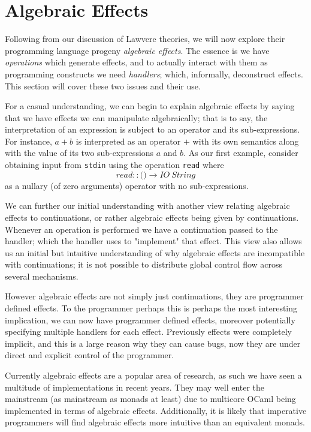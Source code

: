 \section{Algebraic Effects}
Following from our discussion of Lawvere theories,
we will now explore their programming language progeny \textit{algebraic effects}.
The essence is we have \textit{operations} which generate effects,
and to actually interact with them as programming constructs
we need \textit{handlers}\cite{plotkin2009handlers};
which, informally, deconstruct effects.
This section will cover these two issues and their use.

For a casual understanding,
we can begin to explain algebraic effects by saying that
we have effects we can manipulate algebraically; that is to say,
the interpretation of an expression is
subject to an operator and its sub-expressions.
For instance, $a + b$ is interpreted as an operator
$+$ with its own semantics along with the value of its
two sub-expressions $a$ and $b$.
As our first example, consider obtaining input from
\texttt{stdin} using the operation \texttt{read} where
\begin{equation}
    read :: \texttt{()} \rightarrow IO\ String
\end{equation}
as a nullary (of zero arguments) operator with no sub-expressions.

We can further our initial understanding with another view
relating algebraic effects to continuations,
or rather algebraic effects being given by continuations.
Whenever an operation is performed we have a continuation
passed to the handler;
which the handler uses to "implement" that effect.
This view also allows us an initial but intuitive
understanding of why algebraic effects are incompatible with continuations;
it is not possible to distribute global control flow across several mechanisms.

However algebraic effects are not simply just continuations,
they are programmer defined effects.
To the programmer perhaps this is perhaps the most interesting implication,
we can now have programmer defined effects,
moreover potentially specifying multiple handlers for each effect.
Previously effects were completely implicit,
and this is a large reason why they can cause bugs,
now they are under direct and explicit control of the programmer.

Currently algebraic effects are a popular area of research,
as such we have seen a multitude of implementations in recent years.
They may well enter the mainstream (as mainstream as monads at least)
due to multicore OCaml being implemented in terms of algebraic effects.
Additionally, it is likely that imperative programmers
will find algebraic effects more intuitive than an equivalent monads.

